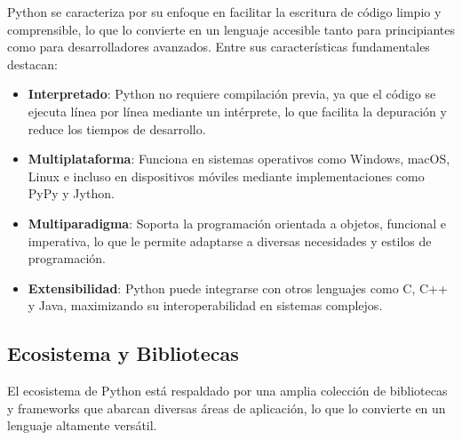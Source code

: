 \documentclass[conference]{IEEEtran}
\begin{document}
Python se caracteriza por su enfoque en facilitar la escritura de código limpio y comprensible, lo que lo convierte en un lenguaje accesible tanto para principiantes como para desarrolladores avanzados. Entre sus características fundamentales destacan:  

\begin{itemize}
    \item \textbf{Interpretado}: Python no requiere compilación previa, ya que el código se ejecuta línea por línea mediante un intérprete, lo que facilita la depuración y reduce los tiempos de desarrollo.  
    \item \textbf{Multiplataforma}: Funciona en sistemas operativos como Windows, macOS, Linux e incluso en dispositivos móviles mediante implementaciones como PyPy y Jython.  
    \item \textbf{Multiparadigma}: Soporta la programación orientada a objetos, funcional e imperativa, lo que le permite adaptarse a diversas necesidades y estilos de programación.  
    \item \textbf{Extensibilidad}: Python puede integrarse con otros lenguajes como C, C++ y Java, maximizando su interoperabilidad en sistemas complejos.  
\end{itemize}

\subsection{Ecosistema y Bibliotecas}

El ecosistema de Python está respaldado por una amplia colección de bibliotecas y frameworks que abarcan diversas áreas de aplicación, lo que lo convierte en un lenguaje altamente versátil.  
\end{document}
